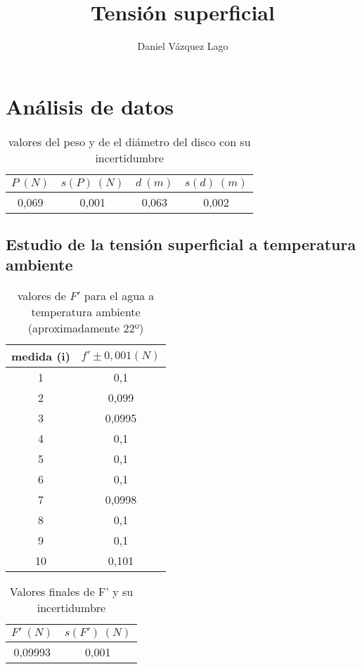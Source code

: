\documentclass[10pt,a4paper]{article}
\author{Daniel Vázquez Lago}
\begin{document}
\title{Tensión superficial}
\maketitle \newpage
\tableofcontents \newpage
\section{Análisis de datos}
\begin{table}[h]
\begin{center}
\begin{tabular}{|c|c|c|c|} \hline
$P  \ (N)$ & $s(P) \ (N)$ & $d \ (m)$ & $s(d) \ (m)$ 
  \\ \hline
0,069  & 0,001 & 0,063  & 0,002 
  \\  \hline
\end{tabular}
\caption{valores del peso y de el diámetro del disco con su incertidumbre}
\label{tab:masa y peso}
\end{center}
\end{table}

\subsection{Estudio de la tensión superficial a temperatura ambiente}

\begin{table}[h]
\begin{center}
\begin{tabular}{|c|c|}
\hline

medida (i) & 	 $f ' \pm 0,001 (N) $ \\ \hline
1 & 	 0,1 \\ 
2 & 	 0,099 \\ 
3 & 	 0,0995 \\ 
4 & 	 0,1 \\ 
5 & 	 0,1 \\ 
6 & 	 0,1 \\ 
7 & 	 0,0998 \\ 
8 & 	 0,1 \\ 
9 & 	 0,1 \\ 
10 & 	 0,101 \\  \hline
\end{tabular}
\caption{valores de $F'$ para el agua a temperatura ambiente (aproximadamente 22º)}
\end{center}
\label{tab:F'  }
\end{table}

\begin{table}[h!] %
\begin{center}
\begin{tabular}{|c|c|}
\hline
$F' \ (N)$ &  $s(F') \ (N)$ \\ \hline
0,09993 & 0,001 \\ \hline
\end{tabular}
\caption{Valores finales de F' y su incertidumbre}

\label{tab:valores finales F' a temperatura ambiente}
\end{center}
\end{table}
\end{document}
